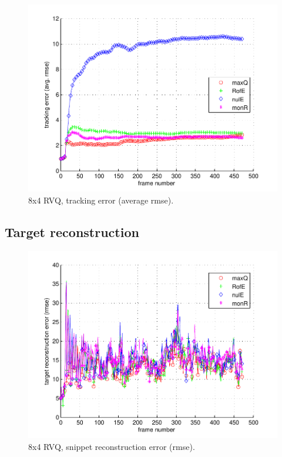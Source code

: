								\begin{figure}[h!]
								\centering
								\includegraphics[height=0.38\textheight]{thesis/5_fish_8_4_1000_trk_armse.pdf}
								\caption{8x4 RVQ, tracking error (average rmse).}
								\label{fig:5_fish_8_4_1000_trk_avg_rmse}
								\end{figure}

\clearpage
\newpage
\subsection{Target reconstruction}

								\begin{figure}[h!]
								\centering
								\includegraphics[height=0.4\textheight]{thesis/5_fish_8_4_1000_snp_rmse.pdf}
								\caption{8x4 RVQ, snippet reconstruction error (rmse).}
								\label{fig:5_fish_8_4_1000_snp_rmse}
								\end{figure}


